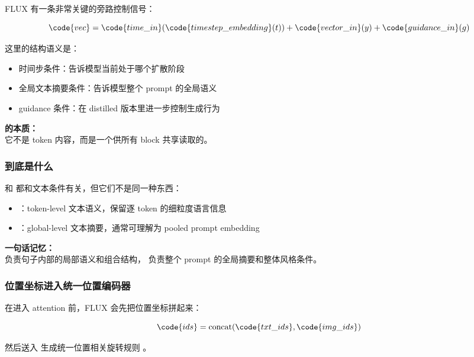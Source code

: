 FLUX 有一条非常关键的旁路控制信号：

\[
\code{vec} = \code{time\_in}(\code{timestep\_embedding}(t)) + \code{vector\_in}(y) + \code{guidance\_in}(g)
\]

这里的结构语义是：

\begin{itemize}[leftmargin=1.5em]
  \item 时间步条件：告诉模型当前处于哪个扩散阶段
  \item 全局文本摘要条件：告诉模型整个 prompt 的全局语义
  \item guidance 条件：在 distilled 版本里进一步控制生成行为
\end{itemize}

\begin{conceptbox}
\textbf{ 的本质：}\\
它不是 token 内容，而是一个供所有 block 共享读取的。
\end{conceptbox}

\subsubsection{ 到底是什么}

 和  都和文本条件有关，但它们不是同一种东西：

\begin{itemize}[leftmargin=1.5em]
  \item {}：token-level 文本语义，保留逐 token 的细粒度语言信息
  \item {}：global-level 文本摘要，通常可理解为 pooled prompt embedding
\end{itemize}

\begin{summarybox}
\textbf{一句话记忆：}\\
 负责句子内部的局部语义和组合结构， 负责整个 prompt 的全局摘要和整体风格条件。
\end{summarybox}

\subsubsection{位置坐标进入统一位置编码器}

在进入 attention 前，FLUX 会先把位置坐标拼起来：

\[
\code{ids} = \operatorname{concat}(\code{txt\_ids}, \code{img\_ids})
\]

然后送入  生成统一位置相关旋转规则 。

